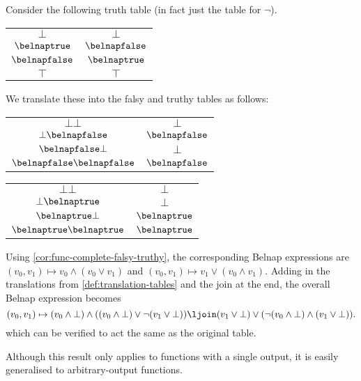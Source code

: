\begin{example}
    Consider the following truth table (in fact just the table for \(\neg\)).
    \begin{center}
        \begin{tabular}{c|c}
            \(\bot\)         & \(\bot\)         \\
            \(\belnaptrue\)  & \(\belnapfalse\) \\
            \(\belnapfalse\) & \(\belnaptrue\)  \\
            \(\top\)         & \(\top\)
        \end{tabular}
    \end{center}
    We translate these into the falsy and truthy tables as follows:
    \begin{center}
        \begin{tabular}{c|c}
            \(\bot\bot\)                 & \(\bot\)         \\
            \(\bot\belnapfalse\)         & \(\belnapfalse\) \\
            \(\belnapfalse\bot\)         & \(\bot\)         \\
            \(\belnapfalse\belnapfalse\) & \(\belnapfalse\)
        \end{tabular}
        \begin{tabular}{c|c}
            \(\bot\bot\)               & \(\bot\)        \\
            \(\bot\belnaptrue\)        & \(\bot\)        \\
            \(\belnaptrue\bot\)        & \(\belnaptrue\) \\
            \(\belnaptrue\belnaptrue\) & \(\belnaptrue\)
        \end{tabular}
    \end{center}
    Using \cref{cor:func-complete-falsy-truthy}, the corresponding Belnap
    expressions are \(
    (v_0,v_1) \mapsto v_0 \land (v_0 \lor v_1)
    \) and \(
    (v_0,v_1) \mapsto v_1 \lor (v_0 \land v_1)
    \).
    Adding in the translations from \cref{def:translation-tables} and the join
    at the end, the overall Belnap expression becomes \[
        (v_0,v_1) \mapsto
        (v_0 \land \bot) \land ((v_0 \land \bot) \lor \neg(v_1 \lor \bot))
        \ljoin
        (v_1 \lor \bot) \lor (\neg(v_0 \land \bot) \land (v_1 \lor \bot)).
    \]
    which can be verified to act the same as the original table.
\end{example}

Although this result only applies to functions with a single output, it is
easily generalised to arbitrary-output functions.


